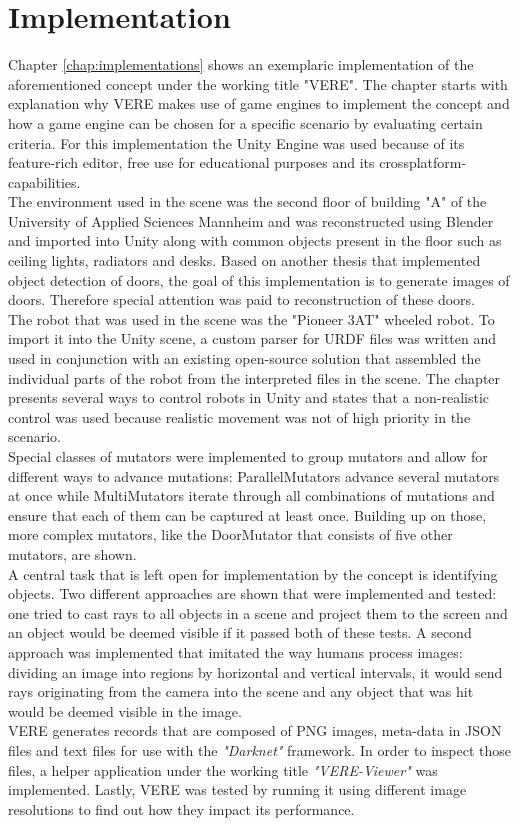 \section{Implementation}
Chapter \ref{chap:implementations} shows an exemplaric implementation of the aforementioned concept under the working title "\ac{VERE}". The chapter starts with explanation why VERE makes use of game engines to implement the concept and how a game engine can be chosen for a specific scenario by evaluating certain criteria. For this implementation the Unity Engine was used because of its feature-rich editor, free use for educational purposes and its crossplatform-capabilities.\\
The environment used in the scene was the second floor of building "A" of the University of Applied Sciences Mannheim and was reconstructed using Blender and imported into Unity along with common objects present in the floor such as ceiling lights, radiators and desks. Based on another thesis that implemented object detection of doors, the goal of this implementation is to generate images of doors. Therefore special attention was paid to reconstruction of these doors.\\
The robot that was used in the scene was the "Pioneer 3AT" wheeled robot. To import it into the Unity scene, a custom parser for \ac{URDF} files was written and used in conjunction with an existing open-source solution that assembled the individual parts of the robot from the interpreted files in the scene. The chapter presents several ways to control robots in Unity and states that a non-realistic control was used because realistic movement was not of high priority in the scenario.\\
Special classes of mutators were implemented to group mutators and allow for different ways to advance mutations: ParallelMutators advance several mutators at once while MultiMutators iterate through all combinations of mutations and ensure that each of them can be captured at least once. Building up on those, more complex mutators, like the DoorMutator that consists of five other mutators, are shown.\\
A central task that is left open for implementation by the concept is identifying objects. Two different approaches are shown that were implemented and tested: one tried to cast rays to all objects in a scene and project them to the screen and an object would be deemed visible if it passed both of these tests. A second approach was implemented that imitated the way humans process images: dividing an image into regions by horizontal and vertical intervals, it would send rays originating from the camera into the scene and any object that was hit would be deemed visible in the image.\\
VERE generates records that are composed of PNG images, meta-data in JSON files and text files for use with the \textit{"Darknet"} framework. In order to inspect those files, a helper application under the working title \emph{"VERE-Viewer"} was implemented. Lastly, \ac{VERE} was tested by running it using different image resolutions to find out how they impact its performance.

